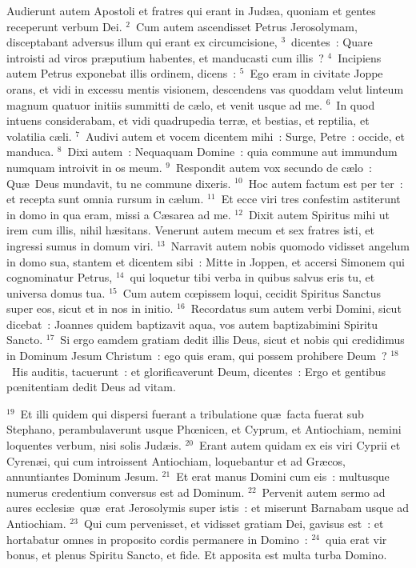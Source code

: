\lettrine[lines=3,image=true,loversize=0.05,lraise=-0.03]{A}{}udierunt autem Apostoli et fratres qui erant in Jud\ae a, quoniam et gentes receperunt verbum Dei.
${}^{2}$~Cum autem ascendisset Petrus Jerosolymam, disceptabant adversus illum qui erant ex circumcisione,
${}^{3}$~dicentes~: Quare introisti ad viros pr\ae putium habentes, et manducasti cum illis~?
${}^{4}$~Incipiens autem Petrus exponebat illis ordinem, dicens~:
${}^{5}$~Ego eram in civitate Joppe orans, et vidi in excessu mentis visionem, descendens vas quoddam velut linteum magnum quatuor initiis summitti de c\ae lo, et venit usque ad me.
${}^{6}$~In quod intuens considerabam, et vidi quadrupedia terr\ae , et bestias, et reptilia, et volatilia c\ae li.
${}^{7}$~Audivi autem et vocem dicentem mihi~: Surge, Petre~: occide, et manduca.
${}^{8}$~Dixi autem~: Nequaquam Domine~: quia commune aut immundum numquam introivit in os meum.
${}^{9}$~Respondit autem vox secundo de c\ae lo~: Qu\ae\ Deus mundavit, tu ne commune dixeris.
${}^{10}$~Hoc autem factum est per ter~: et recepta sunt omnia rursum in c\ae lum.
${}^{11}$~Et ecce viri tres confestim astiterunt in domo in qua eram, missi a C\ae sarea ad me.
${}^{12}$~Dixit autem Spiritus mihi ut irem cum illis, nihil h\ae sitans. Venerunt autem mecum et sex fratres isti, et ingressi sumus in domum viri.
${}^{13}$~Narravit autem nobis quomodo vidisset angelum in domo sua, stantem et dicentem sibi~: Mitte in Joppen, et accersi Simonem qui cognominatur Petrus,
${}^{14}$~qui loquetur tibi verba in quibus salvus eris tu, et universa domus tua.
${}^{15}$~Cum autem cœpissem loqui, cecidit Spiritus Sanctus super eos, sicut et in nos in initio.
${}^{16}$~Recordatus sum autem verbi Domini, sicut dicebat~: Joannes quidem baptizavit aqua, vos autem baptizabimini Spiritu Sancto.
${}^{17}$~Si ergo eamdem gratiam dedit illis Deus, sicut et nobis qui credidimus in Dominum Jesum Christum~: ego quis eram, qui possem prohibere Deum~?
${}^{18}$~His auditis, tacuerunt~: et glorificaverunt Deum, dicentes~: Ergo et gentibus pœnitentiam dedit Deus ad vitam.


${}^{19}$~Et illi quidem qui dispersi fuerant a tribulatione qu\ae\ facta fuerat sub Stephano, perambulaverunt usque Phœnicen, et Cyprum, et Antiochiam, nemini loquentes verbum, nisi solis Jud\ae is.
${}^{20}$~Erant autem quidam ex eis viri Cyprii et Cyren\ae i, qui cum introissent Antiochiam, loquebantur et ad Gr\ae cos, annuntiantes Dominum Jesum.
${}^{21}$~Et erat manus Domini cum eis~: multusque numerus credentium conversus est ad Dominum.
${}^{22}$~Pervenit autem sermo ad aures ecclesi\ae\ qu\ae\ erat Jerosolymis super istis~: et miserunt Barnabam usque ad Antiochiam.
${}^{23}$~Qui cum pervenisset, et vidisset gratiam Dei, gavisus est~: et hortabatur omnes in proposito cordis permanere in Domino~:
${}^{24}$~quia erat vir bonus, et plenus Spiritu Sancto, et fide. Et apposita est multa turba Domino.


